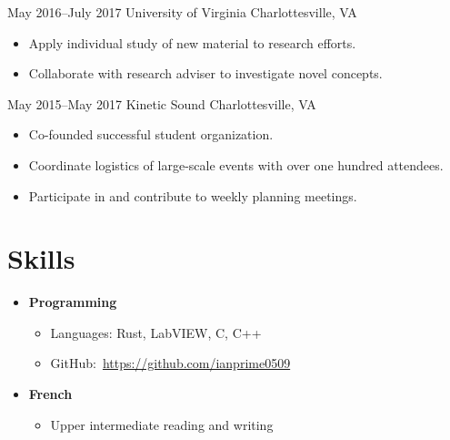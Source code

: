 \documentclass[12pt]{article}
\begin{document}
{May 2016--July 2017}
{University of Virginia}
{Charlottesville, VA}
\begin{itemize}
\item Apply individual study of new material to research efforts.
\item Collaborate with research adviser to investigate novel concepts.
\end{itemize}

{May 2015--May 2017}
{Kinetic Sound}
{Charlottesville, VA}
\begin{itemize}
\item Co-founded successful student organization.
\item Coordinate logistics of large-scale events with over one hundred attendees.
\item Participate in and contribute to weekly planning meetings.
\end{itemize}

\section*{Skills}
\begin{itemize}
\item {\bf Programming}
  \begin{itemize}
  \item Languages: Rust, LabVIEW, C, C++
  \item GitHub:~\url{https://github.com/ianprime0509}
  \end{itemize}
\item {\bf French}
  \begin{itemize}
  \item Upper intermediate reading and writing
  \end{itemize}
\end{itemize}
\end{document}
